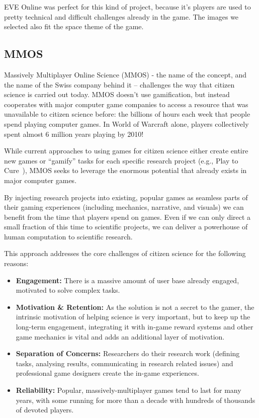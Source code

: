 	EVE Online was perfect for this kind of project, because it's players are used to pretty technical and difficult challenges already in the game. The images we selected also fit the space theme of the game.

\subsection{MMOS}

	Massively Multiplayer Online Science (MMOS) - the name of the concept, and the name of the Swiss company behind it – challenges the way that citizen science is	carried out today. MMOS doesn’t use gamification, but instead cooperates with major	computer game companies to access a resource that was unavailable to citizen science before: the billions of hours each week that people spend playing computer	games. In World of Warcraft alone, players collectively spent almost 6 million years playing by 2010!

	While current approaches to using games for citizen science either create entire new games or ``gamify'' tasks for each specific research project (e.g., Play to Cure~\cite{playtocure}), MMOS seeks to leverage the enormous potential that already exists in major computer games. 

	By injecting research projects into existing, popular games as seamless parts of their gaming experiences (including mechanics, narrative, and visuals) we can benefit from the time that players spend on games. Even if we can only direct a small fraction of this time to scientific projects, we can deliver a powerhouse of human computation to scientific research.

	This approach addresses the core challenges of citizen science for the following reasons:

	\begin{itemize}
	  \item {\bf Engagement:} There is a massive amount of user base already engaged, motivated to
	  solve complex tasks.
	  \item {\bf Motivation \& Retention:} As the solution is not a secret to the gamer, the intrinsic motivation of
	  helping science is very important, but to keep up the long-term engagement,
	  integrating it with in-game reward systems and other game mechanics is vital
	  and adds an additional layer of motivation.
	  \item {\bf Separation of Concerns:} Researchers do their research work
	  (defining tasks, analysing results, communicating in research related issues)
	  and professional game designers create the in-game experiences.
	  \item {\bf Reliability:} Popular, massively-multiplayer games tend to last for many years, with some running for more than a decade
	  with hundreds of thousands of devoted players.
	\end{itemize}

